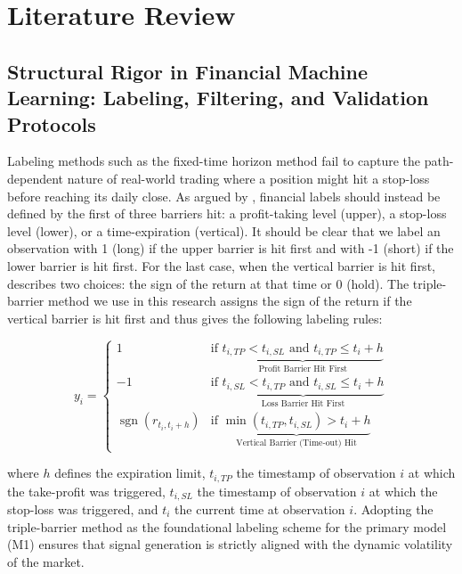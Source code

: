 \documentclass[12pt, a4paper]{article}
\begin{document}
\section{Literature Review}

\subsection{Structural Rigor in Financial Machine Learning: Labeling, Filtering, and Validation Protocols}\label{sec:label_filter_validate}

Labeling methods such as the fixed-time horizon method fail to capture the path-dependent nature of real-world trading where a position might hit a stop-loss 
before reaching its daily close. As argued by \textcite{lopez_de_prado_advances_2018}, financial labels should instead be defined by the first of three barriers hit: 
a profit-taking level (upper), a stop-loss level (lower), or a time-expiration (vertical). It should be clear that we label an observation with 1 (long) if the upper
barrier is hit first and with -1 (short) if the lower barrier is hit first. For the last case, when the vertical barrier is hit first, \textcite{lopez_de_prado_advances_2018}
describes two choices: the sign of the return at that time or 0 (hold). The triple-barrier method we use in this research assigns the sign of the return if the vertical
barrier is hit first and thus gives the following labeling rules:

\begin{equation}
y_i = \begin{cases}
1 & \text{if } \underbrace{t_{i, TP} < t_{i, SL} \text{ and } t_{i, TP} \leq t_i + h}_{\text{Profit Barrier Hit First}} \\
-1 & \text{if } \underbrace{t_{i, SL} < t_{i, TP} \text{ and } t_{i, SL} \leq t_i + h}_{\text{Loss Barrier Hit First}} \\
\operatorname{sgn}(r_{t_i, t_i+h}) & \text{if } \underbrace{\min(t_{i, TP}, t_{i, SL}) > t_i + h}_{\text{Vertical Barrier (Time-out) Hit}}
\end{cases}
\label{eq:tbm_binary}
\end{equation}

where \( h \) defines the expiration limit, \( t_{i, TP} \) the timestamp of observation \( i \) at which the take-profit was triggered, 
\(t_{i, SL} \) the timestamp of observation \( i \) at which the stop-loss was triggered, and \( t_i \) the current time at observation \( i \).
Adopting the triple-barrier method as the foundational labeling scheme for the primary model (M1) ensures that signal generation is 
strictly aligned with the dynamic volatility of the market.
\end{document}
